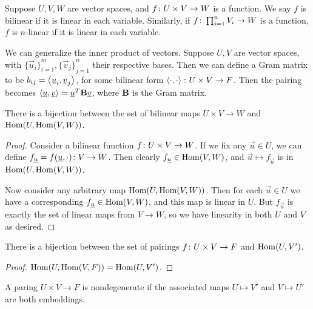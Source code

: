 \begin{definition}
    Suppose \(U,V,W\) are vector spaces,
    and \(f\colon U \times V\to W\) is a function.
    We say \(f\) is bilinear if it is linear in each variable.
    Similarly, if \(f\colon\prod_{i=1}^n V_i\to W\) is a function,
    \(f\) is \(n\)-linear if it is linear in each variable.
\end{definition}
\begin{definition}
    We can generalize the inner product of vectors.
    Suppose \(U,V\) are vector spaces,
    with \({\{\vec{u}_i\}}_{i=1}^m,{\{\vec{v}_j\}}_{j=1}^n\) their respective bases.
    Then we can define a Gram matrix to be \(b_{ij} = \left\langle\underline{u}_i,\underline{v}_j\right\rangle\),
    for some bilinear form \(\left\langle\cdot,\cdot\right\rangle\colon U \times V\to F\).
    Then the pairing becomes \(\left\langle\underline{u},\underline{v}\right\rangle = \underline{u}^T \vb{B} \underline{v}\),
    where \(\vb{B}\) is the Gram matrix.
\end{definition}
\begin{theorem}
    There is a bijection between the set of bilinear maps \(U \times V \to W\)
    and \(\operatorname{Hom}(U,\operatorname{Hom}(V,W))\).
\end{theorem}
\begin{proof}
    Consider a bilinear function \(f\colon U \times V\to W\).
    If we fix any \(\vec{u} \in U\),
    we can define \(f_{\underline{u}} = f(\underline{u},\cdot)\colon V\to W\).
    Then clearly \(f_{\underline{u}} \in \operatorname{Hom}(V,W)\),
    and \(\vec{u} \mapsto f_{\vec{u}}\) is in \(\operatorname{Hom}(U,\operatorname{Hom}(V,W))\).

    Now consider any arbitrary map \(\operatorname{Hom}(U,\operatorname{Hom}(V,W))\).
    Then for each \(\vec{u} \in U\) we have a corresponding \(f_{\underline{u}} \in \operatorname{Hom}(V,W)\),
    and this map is linear in \(U\).
    But \(f_{\vec{u}}\) is exactly the set of linear maps from \(V \to W\),
    so we have linearity in both \(U\) and \(V\) as desired.
\end{proof}
\begin{corollary}
    There is a bijection between the set of pairings \(f\colon U \times V\to F\)
    and \(\operatorname{Hom}(U,V')\).
\end{corollary}
\begin{proof}
    \(\operatorname{Hom}(U,\operatorname{Hom}(V,F)) = \operatorname{Hom}(U,V')\).
\end{proof}
\begin{definition}
    A paring \(U \times V \to F\) is nondegenerate
    if the associated maps \(U \mapsto V'\) and \(V \mapsto U'\) are both embeddings.
\end{definition}

